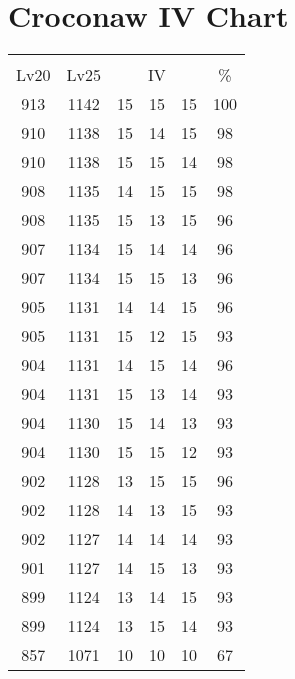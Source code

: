\documentclass{article}%
\begin{document}
%
\normalsize%
\section{Croconaw IV Chart}%
\label{sec:Croconaw IV Chart}%
\renewcommand{\arraystretch}{1.5}%
\begin{tabular}{|c|c|c|c|c|c|}%
\hline%
\multicolumn{6}{|c|}{\textcolor{white}{ 
\linebreak{Croconaw}
}%
\cellcolor{black}}\\%
\multicolumn{1}{|c}{Lv20}&\multicolumn{1}{c|}{Lv25}&\multicolumn{3}{c|}{IV}&\multicolumn{1}{|c|}{\%}\\%
\hline%
\rowcolor{color100}%
913&1142&15&15&15&100\\%
\hline%
\rowcolor{color98}%
910&1138&15&14&15&98\\%
\hline%
\rowcolor{color98}%
910&1138&15&15&14&98\\%
\hline%
\rowcolor{color98}%
908&1135&14&15&15&98\\%
\hline%
\rowcolor{color96}%
908&1135&15&13&15&96\\%
\hline%
\rowcolor{color96}%
907&1134&15&14&14&96\\%
\hline%
\rowcolor{color96}%
907&1134&15&15&13&96\\%
\hline%
\rowcolor{color96}%
905&1131&14&14&15&96\\%
\hline%
\rowcolor{color93}%
905&1131&15&12&15&93\\%
\hline%
\rowcolor{color96}%
904&1131&14&15&14&96\\%
\hline%
\rowcolor{color93}%
904&1131&15&13&14&93\\%
\hline%
\rowcolor{color93}%
904&1130&15&14&13&93\\%
\hline%
\rowcolor{color93}%
904&1130&15&15&12&93\\%
\hline%
\rowcolor{color96}%
902&1128&13&15&15&96\\%
\hline%
\rowcolor{color93}%
902&1128&14&13&15&93\\%
\hline%
\rowcolor{color93}%
902&1127&14&14&14&93\\%
\hline%
\rowcolor{color93}%
901&1127&14&15&13&93\\%
\hline%
\rowcolor{color93}%
899&1124&13&14&15&93\\%
\hline%
\rowcolor{color93}%
899&1124&13&15&14&93\\%
\hline%
\rowcolor{color91}%
857&1071&10&10&10&67\\%
\end{tabular}

%
\end{document}
